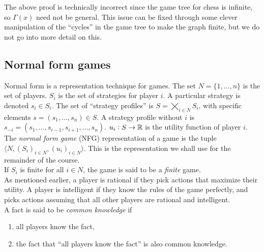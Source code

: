 	\begin{remark}
		The above proof is technically incorrect since the game tree for chess is infinite, so $\Gamma(x)$ need not be general. This issue can be fixed through some clever manipulation of the ``cycles'' in the game tree to make the graph finite, but we do not go into more detail on this.
	\end{remark}

\subsection{Normal form games}

	Normal form is a representation technique for games. The set $N = \{1,\ldots,n\}$ is the set of players. $S_i$ is the set of strategies for player $i$. A particular strategy is denoted $s_i \in S_i$. The set of ``strategy profiles'' is $S = \bigtimes_{i \in N} S_i$, with specific elements $s = (s_1,\ldots,s_n) \in S$. A strategy profile without $i$ is $s_{-i} = (s_1,\ldots,s_{i-1},s_{i+1},\ldots,s_n)$. $u_i : S \to \mathbb{R}$ is the utility function of player $i$.\\
	The \emph{normal form game} (NFG) representation of a game is the tuple $\langle N , (S_i)_{i \in N} , (u_i)_{i \in N} \rangle$. This is the representation we shall use for the remainder of the course. \\
	If $S_i$ is finite for all $i \in N$, the game is said to be a \emph{finite} game.\\

	As mentioned earlier, a player is rational if they pick actions that maximize their utility. A player is intelligent if they know the rules of the game perfectly, and picks actions assuming that all other players are rational and intelligent.\\

	A fact is said to be \emph{common knowledge} if
	\begin{enumerate}
		\item all players know the fact,
		\item the fact that ``all players know the fact'' is also common knowledge.
	\end{enumerate}

